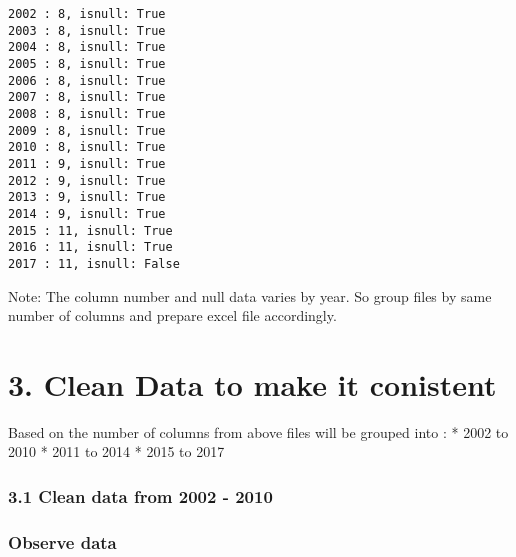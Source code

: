 \documentclass[11pt]{article}
\begin{document}
    \begin{Verbatim}[commandchars=\\\{\}]
2002 : 8, isnull: True
2003 : 8, isnull: True
2004 : 8, isnull: True
2005 : 8, isnull: True
2006 : 8, isnull: True
2007 : 8, isnull: True
2008 : 8, isnull: True
2009 : 8, isnull: True
2010 : 8, isnull: True
2011 : 9, isnull: True
2012 : 9, isnull: True
2013 : 9, isnull: True
2014 : 9, isnull: True
2015 : 11, isnull: True
2016 : 11, isnull: True
2017 : 11, isnull: False

    \end{Verbatim}

    Note: The column number and null data varies by year. So group files by
same number of columns and prepare excel file accordingly.

    \section{3. Clean Data to make it
conistent}\label{clean-data-to-make-it-conistent}

    Based on the number of columns from above files will be grouped into : *
2002 to 2010 * 2011 to 2014 * 2015 to 2017

    \subsubsection{3.1 Clean data from 2002 -
2010}\label{clean-data-from-2002---2010}

    \subsubsection{Observe data}\label{observe-data}
\end{document}

